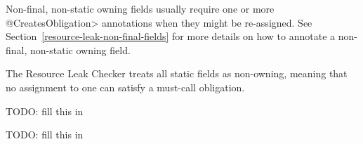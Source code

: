 Non-final, non-static owning fields usually require one or more \<@CreatesObligation> annotations
when they might be re-assigned. See Section~\ref{resource-leak-non-final-fields} for
more details on how to annotate a non-final, non-static owning field.

The Resource Leak Checker treats all static fields as non-owning, meaning that no assignment to one
can satisfy a must-call obligation.


TODO: fill this in


TODO: fill this in

